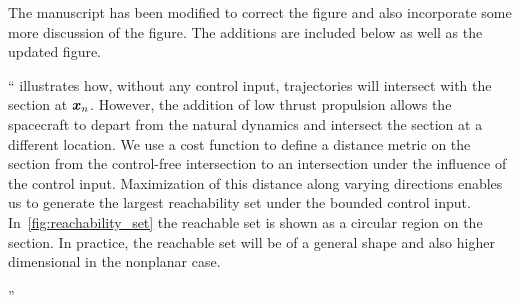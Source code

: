 \documentclass[11pt]{article}
\newenvironment{correction}{\begin{list}{}{\setlength{\leftmargin}{1cm}\setlength{\rightmargin}{1cm}}\vspace{\parsep}\item[]``}{''\end{list}}
\begin{document}
\begin{enumerate}
The manuscript has been modified to correct the figure and also incorporate some more discussion of the figure. 
The additions are included below as well as the updated figure.
\begin{correction}
 illustrates how, without any control input, trajectories will intersect with the \Poincare section at \( \bm{x}_n \). 
However, the addition of low thrust propulsion allows the spacecraft to depart from the natural dynamics and intersect the \Poincare section at a different location.
We use a cost function to define a distance metric on the \Poincare section from the control-free intersection to an intersection under the influence of the control input.
Maximization of this distance along varying directions enables us to generate the largest reachability set under the bounded control input.
In~\cref{fig:reachability_set} the reachable set is shown as a circular region on the \Poincare section.
In practice, the reachable set will be of a general shape and also higher dimensional in the nonplanar case.
\begin{figure}
        \centering
        \begin{scaletikzpicturetowidth}{0.5\textwidth}
\end{scaletikzpicturetowidth}
\end{figure}
\end{correction}
\end{enumerate}
\end{document}
